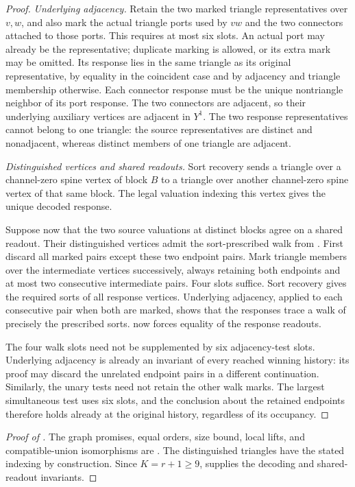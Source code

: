 \documentclass[11pt]{article}
\theoremstyle{definition}
\begin{document}
\begin{proof}
\emph{Underlying adjacency.}
Retain the two marked triangle representatives over \(v,w\), and
also mark the actual triangle ports used by \(vw\) and the two
connectors attached to those ports.  This requires at most six slots.
An actual port may already be the representative; duplicate marking
is allowed, or its extra mark may be omitted.
Its response lies in the same triangle as its original
representative, by equality in the coincident case and by adjacency
and triangle membership otherwise.
Each connector response must be the unique nontriangle neighbor of
its port response.  The two connectors are adjacent, so their
underlying auxiliary vertices are adjacent in \(Y^1\).
The two response representatives cannot belong to one triangle:
the source representatives are distinct and nonadjacent, whereas
distinct members of one triangle are adjacent.

\emph{Distinguished vertices and shared readouts.}
Sort recovery sends a triangle over a channel-zero spine vertex
of block \(B\) to a triangle over another channel-zero spine vertex
of that same block.  The legal valuation indexing this vertex gives
the unique decoded response.

Suppose now that the two source valuations at distinct blocks agree
on a shared readout.
Their distinguished vertices admit the sort-prescribed walk from
.
First discard all marked pairs except these two endpoint pairs.
Mark triangle members over the intermediate vertices successively,
always retaining both endpoints and at most two consecutive
intermediate pairs.  Four slots suffice.
Sort recovery gives the required sorts of all response vertices.
Underlying adjacency, applied to each consecutive pair when both are
marked, shows that the responses trace a walk of precisely the
prescribed sorts.
 now forces equality of the response readouts.

The four walk slots need not be supplemented by six adjacency-test
slots.  Underlying adjacency is already an invariant of every reached
winning history: its proof may discard the unrelated endpoint pairs
in a different continuation.  Similarly, the unary tests need not
retain the other walk marks.
The largest simultaneous test uses six slots, and the conclusion
about the retained endpoints therefore holds already at the original
history, regardless of its occupancy.
\end{proof}

\begin{proof}[Proof of ]
The graph promises, equal orders, size bound, local lifts, and
compatible-union isomorphisms are
.
The distinguished triangles have the stated indexing by construction.
Since \(K=r+1\ge9\),  supplies the
decoding and shared-readout invariants.
\end{proof}
\end{document}
